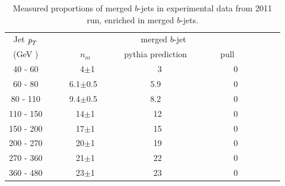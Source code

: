 
\begin{table}[!hbt] %
\renewcommand{\arraystretch}{1.2}
\centering
\begin{tabular}{ | c || c | c | c ||}
  \hline
  Jet ${\emph{p}_{T}}$ & \multicolumn{3}{c||}{merged $b$-jet}\\ \cline{2-4}
    (GeV ) & ~~~~~~~$n_m$~~~~~~ & pythia prediction & ~~~~~~pull~~~~~~~~~~\\ \hline
   40 - 60 &  ~~4$\pm$1  &    ~~3  &  0  \\  
   60 - 80 &  6.1$\pm$0.5  &  5.9  &  0  \\ 
   80 - 110&  9.4$\pm$0.5  &  8.2  &  0  \\ 
  110 - 150&  ~14$\pm$1    &  ~12  &  0  \\ 
  150 - 200&  ~17$\pm$1    &  ~15  &  0  \\ 
  200 - 270&  ~20$\pm$1    &  ~19  &  0  \\ 
  270 - 360&  ~21$\pm$1    &  ~22  &  0  \\ 
  360 - 480&  ~23$\pm$1    &  ~23  &  0  \\ \hline
\end{tabular}
\caption{Measured proportions of merged $b$-jets in experimental data from 2011 run, enriched in merged $b$-jets.}
\label{tb:fitfractions2btagM}
\end{table}

